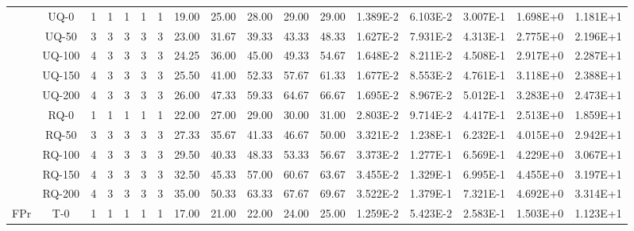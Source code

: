 \begin{table}[ht]
\begin{center}
{\begin{tabular}{cc|c|c|c|c|c|c|c|c|c|c|c|c|c|c|c|}
\cline{2-17}																														
\multicolumn{1}{|c|}{}                      & \multicolumn{1}{|c|}{UQ-0} &	1	&	1	&	1	&	1	&	1	&	19.00	&	25.00	&	28.00	&	29.00	&	29.00	&	1.389E-2	&	6.103E-2	&	3.007E-1	&	1.698E+0	&	1.181E+1	\\
\multicolumn{1}{|c|}{}                      & \multicolumn{1}{|c|}{UQ-50} &	3	&	3	&	3	&	3	&	3	&	23.00	&	31.67	&	39.33	&	43.33	&	48.33	&	1.627E-2	&	7.931E-2	&	4.313E-1	&	2.775E+0	&	2.196E+1	\\
\multicolumn{1}{|c|}{}                      & \multicolumn{1}{|c|}{UQ-100} &	4	&	3	&	3	&	3	&	3	&	24.25	&	36.00	&	45.00	&	49.33	&	54.67	&	1.648E-2	&	8.211E-2	&	4.508E-1	&	2.917E+0	&	2.287E+1	\\
\multicolumn{1}{|c|}{}                      & \multicolumn{1}{|c|}{UQ-150} &	4	&	3	&	3	&	3	&	3	&	25.50	&	41.00	&	52.33	&	57.67	&	61.33	&	1.677E-2	&	8.553E-2	&	4.761E-1	&	3.118E+0	&	2.388E+1	\\
\multicolumn{1}{|c|}{}                      & \multicolumn{1}{|c|}{UQ-200} &	4	&	3	&	3	&	3	&	3	&	26.00	&	47.33	&	59.33	&	64.67	&	66.67	&	1.695E-2	&	8.967E-2	&	5.012E-1	&	3.283E+0	&	2.473E+1	\\
\cline{2-17}																														
\multicolumn{1}{|c|}{}                      & \multicolumn{1}{|c|}{RQ-0} &	1	&	1	&	1	&	1	&	1	&	22.00	&	27.00	&	29.00	&	30.00	&	31.00	&	2.803E-2	&	9.714E-2	&	4.417E-1	&	2.513E+0	&	1.859E+1	\\
\multicolumn{1}{|c|}{}                      & \multicolumn{1}{|c|}{RQ-50} & 	3	&	3	&	3	&	3	&	3	&	27.33	&	35.67	&	41.33	&	46.67	&	50.00	&	3.321E-2	&	1.238E-1	&	6.232E-1	&	4.015E+0	&	2.942E+1	\\
\multicolumn{1}{|c|}{}                      & \multicolumn{1}{|c|}{RQ-100} &	4	&	3	&	3	&	3	&	3	&	29.50	&	40.33	&	48.33	&	53.33	&	56.67	&	3.373E-2	&	1.277E-1	&	6.569E-1	&	4.229E+0	&	3.067E+1	\\
\multicolumn{1}{|c|}{}                      & \multicolumn{1}{|c|}{RQ-150} &	4	&	3	&	3	&	3	&	3	&	32.50	&	45.33	&	57.00	&	60.67	&	63.67	&	3.455E-2	&	1.329E-1	&	6.995E-1	&	4.455E+0	&	3.197E+1	\\
\multicolumn{1}{|c|}{}                      & \multicolumn{1}{|c|}{RQ-200} & 	4	&	3	&	3	&	3	&	3	&	35.00	&	50.33	&	63.33	&	67.67	&	69.67	&	3.522E-2	&	1.379E-1	&	7.321E-1	&	4.692E+0	&	3.314E+1	\\
\cline{1-17}																														
\multicolumn{1}{|c|}{\multirow{15}{*}{FPr}} & \multicolumn{1}{|c|}{T-0} & 	1	&	1	&	1	&	1	&	1	&	17.00	&	21.00	&	22.00	&	24.00	&	25.00	&	1.259E-2	&	5.423E-2	&	2.583E-1	&	1.503E+0	&	1.123E+1	\\

\end{tabular}}
\end{center}
\end{table}
